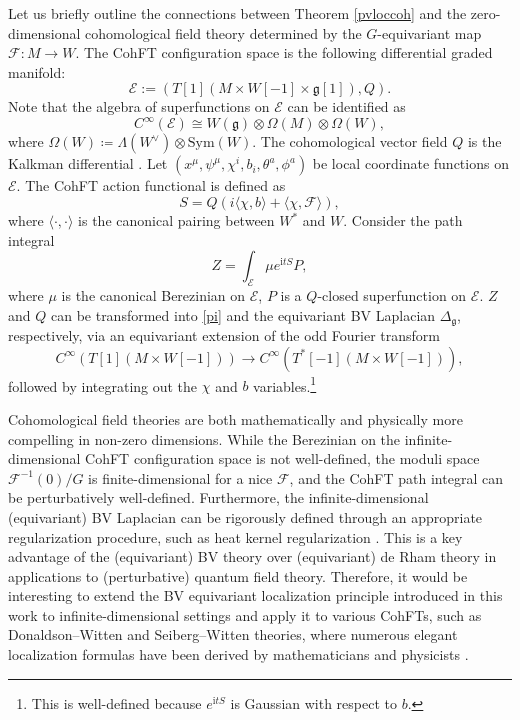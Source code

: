 \documentclass[12pt]{amsart}
\numberwithin{table}{section}
\numberwithin{equation}{section}
\theoremstyle{plain}
\newcommand{\sF}{\mathcal{F}}
\newcommand{\Sym}{\mathrm{Sym}}
\begin{document}
Let us briefly outline the connections between Theorem \ref{pvloccoh} and the zero-dimensional cohomological field theory determined by the $G$-equivariant map $\sF\colon M \rightarrow W$. The CohFT configuration space is the following differential graded manifold: 
\[
\mathcal{E}:=(T[1](M \times W[-1] \times \mathfrak{g}[1]), Q).
\]
Note that the algebra of superfunctions on $\mathcal{E}$ can be identified as
\[
C^{\infty}(\mathcal{E}) \cong W(\mathfrak{g}) \otimes \Omega(M) \otimes \Omega(W),
\]
where $\Omega(W) \coloneqq \Lambda (W^{\vee}) \otimes \Sym (W)$. The cohomological vector field $Q$ is the Kalkman differential \cite{kalkman1993brst}. %
Let $(x^{\mu}, \psi^{\mu}, \chi^{i}, b_i, \theta^a, \phi^a)$ be local coordinate functions on $\mathcal{E}$. The CohFT action functional is defined as
\[
S = Q(i\langle \chi, b \rangle + \langle \chi, \sF \rangle),
\]
where $\langle \cdot, \cdot \rangle$ is the canonical pairing between $W^*$ and $W$. Consider the path integral 
\[
Z = \int_{\mathcal{E}} \mu e^{\mathrm{i}tS} P,
\]
where $\mu$ is the canonical Berezinian on $\mathcal{E}$, $P$ is a $Q$-closed superfunction on $\mathcal{E}$. $Z$ and $Q$ can be transformed into \eqref{pi} and the equivariant BV Laplacian $\Delta_{\mathfrak{g}}$, respectively, via an equivariant extension of the odd Fourier transform \cite{qiu2011introduction}
\[
C^{\infty}(T[1](M\times W[-1])) \rightarrow C^{\infty}(T^*[-1](M\times W[-1])),
\]
followed by integrating out the $\chi$ and $b$ variables.\footnote{This is well-defined because $e^{\mathrm{i}tS}$ is Gaussian with respect to $b$.}

Cohomological field theories are both mathematically and physically more compelling in non-zero dimensions. While the Berezinian on the infinite-dimensional CohFT configuration space is not well-defined, the moduli space $\sF^{-1}(0)/G$ is finite-dimensional for a nice $\sF$, and the CohFT path integral can be perturbatively well-defined. Furthermore, the infinite-dimensional (equivariant) BV Laplacian can be rigorously defined through an appropriate regularization procedure, such as heat kernel regularization \cite{costello2022renormalization}. This is a key advantage of the (equivariant) BV theory over (equivariant) de Rham theory in applications to (perturbative) quantum field theory. Therefore, it would be interesting to extend the BV equivariant localization principle introduced in this work to infinite-dimensional settings and apply it to various CohFTs, such as Donaldson--Witten and Seiberg--Witten theories, where numerous elegant localization formulas have been derived by mathematicians and physicists \cite {blau1995localization, constantinescu1998cicular,cordes1995lectures, nekrasov2003seiberg, pestun2012localization, pestun2017localization, vajiac2000derivation}.
\end{document}
